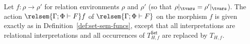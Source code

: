 \documentclass{lmcs}
\theoremstyle{plain}\newtheorem{satz}[thm]{Satz}
\newcommand{\inl}{\mathsf{inl}}
\newcommand{\inr}{\mathsf{inr}}
\newcommand{\set}{\mathsf{Set}}
\renewcommand{\id}{\mathit{id}}
\begin{document}
\begin{defi}\label{def:rel-sem-funcs}
Let $f: \rho \to \rho'$ for relation environments $\rho$ and $\rho'$
(so that $\rho|_\tvars = \rho'|_\tvars$). The action
$\relsem{\Gamma;\Phi \vdash F}f$ of $\relsem{\Gamma;\Phi \vdash F}$ on
the morphism $f$ is given exactly as in
Definition~\ref{def:set-sem-funcs}, except that all interpretations
are relational interpretations and all occurrences of $T^\set_{H,f}$
are replaced by $T_{H,f}$.
\begin{comment}
as follows:
\begin{itemize}
\item If \,$\Gamma;\Phi \vdash \zerot$ then $\relsem{\Gamma;\Phi \vdash
  \zerot}f = \id_0$
\item If\, $\Gamma;\Phi \vdash \onet$ then $\relsem{\Gamma;\Phi \vdash
  \onet}f = \id_1$
\item If \,$\Gamma; \Phi
  \vdash \Nat^{\ol{\alpha}}\,F\,G$ then
  $\relsem{\Gamma; \Phi
    \vdash \Nat^{\ol{\alpha}}\,F\,G} f =$\\
\hspace*{0.2in} $\lambda t : \relsem{\Gamma;\Phi \vdash
    \Nat^{\ol{\alpha}}\,F\,G}\rho.\, 
  (\lambda \ol{A}. \relsem{\Gamma; \Phi,\ol\alpha \vdash G}f[\ol{\alpha
      := id_A}]) \circ t$  
\item If \,$\Gamma;\Phi \vdash \phi \ol{\tau}$, then
  $\relsem{\Gamma;\Phi \vdash \phi \ol{\tau}} f : \relsem{\Gamma;\Phi
  \vdash \phi \ol{\tau}}\rho \to \relsem{\Gamma;\Phi \vdash \phi
  \ol{\tau}}\rho' = (\rho\phi) \ol{\relsem{\Gamma;\Phi \vdash
    \tau}\rho} \to (\rho'\phi) \ol{\relsem{\Gamma;\Phi \vdash
    \tau}\rho'}$ is defined by $\relsem{\Gamma;\Phi \vdash \phi
  \tau{A}} f = (f\phi)_{\ol{\relsem{\Gamma;\Phi \vdash \tau}\rho'}}
  \,\circ\, (\rho\phi) \ol{\relsem{\Gamma;\Phi \vdash \tau}f} =
  (\rho'\phi) \ol{\relsem{\Gamma;\Phi \vdash \tau}f} \,\circ\, (f
  \phi)_{\ol{\relsem{\Gamma;\Phi \vdash \tau}\rho}}$
\item If\, $\Gamma;\Phi\vdash \sigma + \tau$ then $\relsem{\Gamma;\Phi
  \vdash \sigma + \tau}f$ is defined by $\relsem{\Gamma;\Phi \vdash
  \sigma + \tau}f(\inl\,x) = \inl\,(\relsem{\Gamma;\Phi \vdash
  \sigma}f x)$ and $\relsem{\Gamma;\Phi \vdash \sigma +
  \tau}f(\inr\,y) = \inr\,(\relsem{\Gamma;\Phi \vdash \tau}f y)$
\item If\, $\Gamma;\Phi\vdash \sigma \times \tau$ then
  $\relsem{\Gamma;\Phi \vdash \sigma \times \tau}f =
  \relsem{\Gamma;\Phi \vdash \sigma}f \times \relsem{\Gamma;\Phi
    \vdash \tau}f$
\item If\, $\Gamma;\Phi \vdash (\mu \phi^k.\lambda
  \ol{\alpha}. H)\ol{\tau}$ then $\relsem{\Gamma;\Phi \vdash (\mu
    \phi.\lambda \ol{\alpha}. H)\ol{\tau}} f = (\mu
  T_{H,f})\ol{\relsem{\Gamma;\Phi \vdash \tau}\rho'} \circ (\mu
  T_{H,\rho})\ol{\relsem{\Gamma;\Phi \vdash \tau}f} = (\mu
  T_{H,\rho'})\ol{\relsem{\Gamma;\Phi \vdash \tau}f} \circ (\mu
  T_{H,f})\ol{\relsem{\Gamma;\Phi \vdash \tau}\rho}$
\end{itemize}
\end{comment}
\end{defi}
\end{document}
